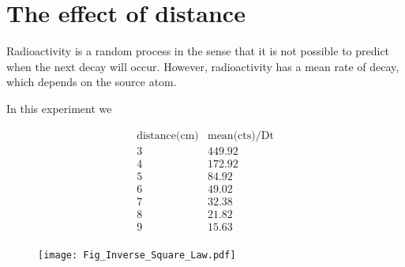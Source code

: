 \section{The effect of distance}

Radioactivity is a random process in the sense that it is not possible to predict when the next decay will occur. However, radioactivity has a mean rate of decay, which depends on the source atom.

In this experiment we



\begin{displaymath}
\begin{array}{cc}
 \text{distance(cm)} & \text{mean(cts)/Dt} 
   \\
3  &  449.92   \\
4  &  172.92   \\
5  &  84.92    \\
6  &  49.02    \\
7  &  32.38    \\
8  &  21.82    \\
9  &  15.63    \\
\end{array}
\end{displaymath}

\begin{figure}
  \texttt{[image: Fig\_Inverse\_Square\_Law.pdf]}
\end{figure}



